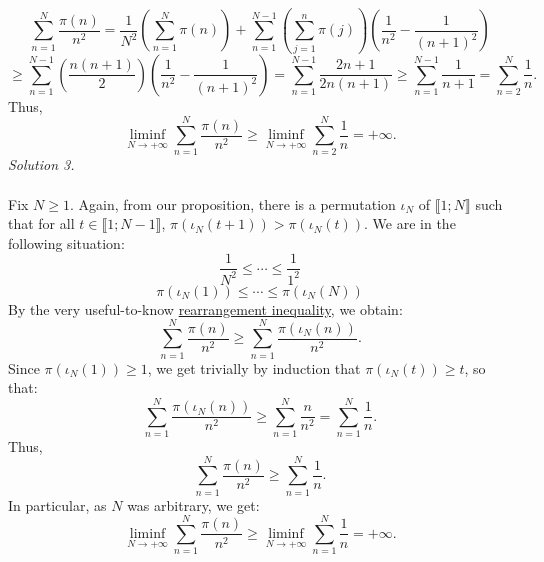 \begin{solution}
    \[
        \sum_{n=1}^{N} \frac{\pi\left(n\right)}{n^2} = \frac{1}{N^2} \left(\sum_{n=1}^{N} \pi\left(n\right)\right) + \sum_{n=1}^{N-1} \left(\sum_{j=1}^{n} \pi\left(j\right)\right) \left( \frac{1}{n^2} - \frac{1}{\left(n+1\right)^2} \right)
    \]
    \[
        \geq \sum_{n=1}^{N-1} \left( \frac{n\left(n+1\right)}{2} \right) \left( \frac{1}{n^2} - \frac{1}{\left(n+1\right)^2} \right) = \sum_{n=1}^{N-1} \frac{2n+1}{2n\left(n+1\right)} \geq \sum_{n=1}^{N-1} \frac{1}{n+1} = \sum_{n=2}^{N} \frac{1}{n}.
    \]
    Thus,
    \[
        \liminf_{N \to +\infty} \sum_{n=1}^{N} \frac{\pi\left(n\right)}{n^2} \geq \liminf_{N \to +\infty} \sum_{n=2}^{N} \frac{1}{n} = +\infty.
    \]
    \textit{Solution 3.}
    \\\\
    Fix \( N \geq 1 \). Again, from our proposition, there is a permutation \( \iota_N \) of \( \llbracket 1;N \rrbracket \) such that for all \( t \in \llbracket 1;N-1 \rrbracket \), \( \pi\left(\iota_N\left(t+1\right)\right) > \pi\left(\iota_N\left(t\right)\right) \). We are in the following situation:
    \[
        \frac{1}{N^2} \leq \cdots \leq \frac{1}{1^2}
    \]
    \[
        \pi\left(\iota_N\left(1\right)\right) \leq \cdots \leq \pi\left(\iota_N\left(N\right)\right)
    \]
    By the very useful-to-know \href{https://en.wikipedia.org/wiki/Rearrangement_inequality}{rearrangement inequality}, we obtain:
    \[
        \sum_{n=1}^{N} \frac{\pi\left(n\right)}{n^2} \geq \sum_{n=1}^{N} \frac{\pi\left(\iota_N\left(n\right)\right)}{n^2}.
    \]
    Since \( \pi\left(\iota_N\left(1\right)\right) \geq 1 \), we get trivially by induction that \( \pi\left(\iota_N\left(t\right)\right) \geq t \), so that:
    \[
        \sum_{n=1}^{N} \frac{\pi\left(\iota_N\left(n\right)\right)}{n^2} \geq \sum_{n=1}^{N} \frac{n}{n^2} = \sum_{n=1}^{N} \frac{1}{n}.
    \]
    Thus,
    \[
        \sum_{n=1}^{N} \frac{\pi\left(n\right)}{n^2} \geq \sum_{n=1}^{N} \frac{1}{n}.
    \]
    In particular, as \( N \) was arbitrary, we get:
    \[
        \liminf_{N \to +\infty} \sum_{n=1}^{N} \frac{\pi\left(n\right)}{n^2} \geq \liminf_{N \to +\infty} \sum_{n=1}^{N} \frac{1}{n} = +\infty.
    \]
\end{solution}
